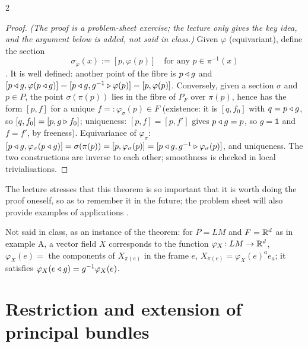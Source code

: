 \begin{paracol}{2}
\begin{proof}
\emph{(The proof is a problem-sheet exercise; the lecture only gives the key idea, and the argument below is added, not said in class.)}   Given $\varphi$ (equivariant), define the section
\[
  \sigma_\varphi(x):=[p,\varphi(p)]\quad\text{for any }p\in\pi^{-1}(x)
\]
  . It is well defined: another point of the fibre is $p\mathbin{\triangleleft} g$ and $[p\mathbin{\triangleleft} g,\varphi(p\mathbin{\triangleleft} g)]=[p\mathbin{\triangleleft} g,g^{-1}\mathbin{\triangleright}\varphi(p)]=[p,\varphi(p)]$. Conversely, given a section $\sigma$ and $p\in P$, the point $\sigma(\pi(p))$ lies in the fibre of $P_F$ over $\pi(p)$, hence has the form $[p,f]$ for a unique $f=:\varphi_\sigma(p)\in F$ (existence: it is $[q,f_0]$ with $q=p\mathbin{\triangleleft} g$, so $[q,f_0]=[p,g\mathbin{\triangleright} f_0]$; uniqueness: $[p,f]=[p,f']$ gives $p\mathbin{\triangleleft} g=p$, so $g=\mathbb 1$ and $f=f'$, by freeness). Equivariance of $\varphi_\sigma$: $[p\mathbin{\triangleleft} g,\varphi_\sigma(p\mathbin{\triangleleft} g)]=\sigma(\pi(p))=[p,\varphi_\sigma(p)]=[p\mathbin{\triangleleft} g,g^{-1}\mathbin{\triangleright}\varphi_\sigma(p)]$, and uniqueness. The two constructions are inverse to each other; smoothness is checked in local trivialisations.  
\end{proof}
The lecture stresses that this theorem is so important that it is worth doing the proof oneself, so as to remember it in the future; the problem sheet will also provide examples of applications   .
\begin{example}\label{ex:ab-vf}
Not said in class, as an instance of the theorem: for $P=LM$ and $F=\mathbb{R}^d$ as in example A, a vector field $X$ corresponds to the function $\varphi_X\colon LM\to\mathbb{R}^d$, $\varphi_X(e)=$ the components of $X_{\pi(e)}$ in the frame $e$, $X_{\pi(e)}=\varphi_X(e)^ae_a$; it satisfies $\varphi_X(e\mathbin{\triangleleft} g)=g^{-1}\varphi_X(e)$.
\end{example}

\section{Restriction and extension of principal bundles}\label{sec:ab-restriction}


\end{paracol}
